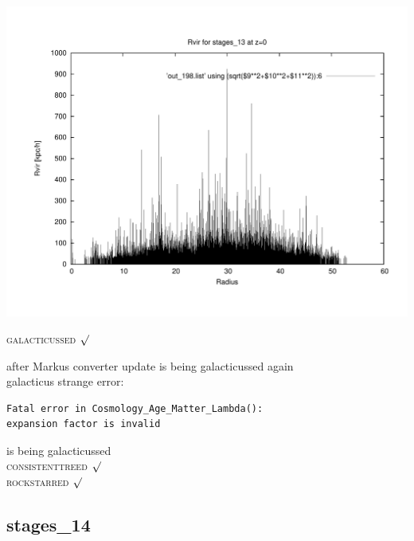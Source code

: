 \includegraphics[scale=0.3]{stages_13/plot_rvir_z0.pdf}

\textsc{galacticussed} $\surd$

after Markus converter update 
is being galacticussed again \\
galacticus strange error: 
\begin{verbatim}
Fatal error in Cosmology_Age_Matter_Lambda():
expansion factor is invalid
\end{verbatim}
is being galacticussed \\
\textsc{consistenttreed} $\surd$ \\ 
\textsc{rockstarred} $\surd$

% 
%
%
%
%
%
%
%


\newpage
\subsection{stages\_14}

